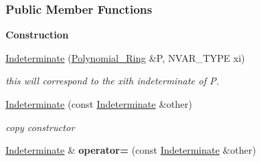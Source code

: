\subsubsection*{Public Member Functions}
\begin{Indent}\textbf{ Construction}\par
\begin{DoxyCompactItemize}
\item 
\mbox{\label{group__polygroup_a69cacbaf1f95b735ae1126de93f1da5c}} 
\hyperlink{group__polygroup_a69cacbaf1f95b735ae1126de93f1da5c}{Indeterminate} (\hyperlink{group__polygroup_class_polynomial___ring}{Polynomial\+\_\+\+Ring} \&P, N\+V\+A\+R\+\_\+\+T\+Y\+PE xi)
\begin{DoxyCompactList}\small\item\em {\ttfamily this} will correspond to the {\ttfamily xi}th indeterminate of {\ttfamily P}. \end{DoxyCompactList}\item 
\mbox{\label{group__polygroup_affe3146cd68726d8a7f7cb1e70bc19fb}} 
\hyperlink{group__polygroup_affe3146cd68726d8a7f7cb1e70bc19fb}{Indeterminate} (const \hyperlink{group__polygroup_class_indeterminate}{Indeterminate} \&other)
\begin{DoxyCompactList}\small\item\em copy constructor \end{DoxyCompactList}\item 
\mbox{\label{group__polygroup_ac2540ce0eecc8b82afd5d6742e27d6e4}} 
\hyperlink{group__polygroup_class_indeterminate}{Indeterminate} \& {\bfseries operator=} (const \hyperlink{group__polygroup_class_indeterminate}{Indeterminate} \&other)
\end{DoxyCompactItemize}
\end{Indent}
